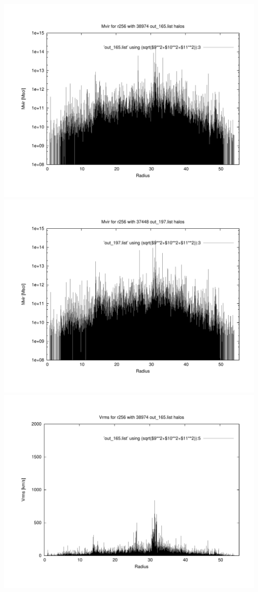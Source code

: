\includegraphics[scale=0.3]{r256/h70/red_st14_log2/plot_mvir_out_165.pdf}
\includegraphics[scale=0.3]{r256/h70/red_st14_log2/plot_mvir_out_197.pdf}
\includegraphics[scale=0.3]{r256/h70/red_st14_log2/plot_Vrms_out_165.pdf}
